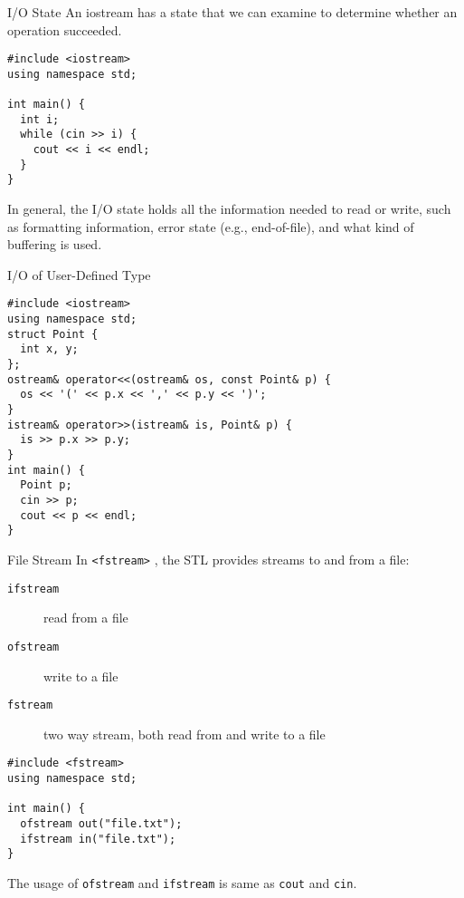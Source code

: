 \documentclass[presentation]{beamer}
\begin{document}
\begin{frame}[fragile,label={sec:orgheadline68}]{I/O State}
 An iostream has a state that we can examine to determine whether an
operation succeeded.

\begin{verbatim}
#include <iostream>
using namespace std;

int main() {
  int i;
  while (cin >> i) {
    cout << i << endl;
  }
}
\end{verbatim}

In general, the I/O state holds all the information needed to read
or write, such as formatting information, error state (e.g.,
end-of-file), and what kind of buffering is used.
\end{frame}

\begin{frame}[fragile,label={sec:orgheadline69}]{I/O of User-Defined Type}
 \begin{verbatim}
#include <iostream>
using namespace std;
struct Point {
  int x, y;
};
ostream& operator<<(ostream& os, const Point& p) {
  os << '(' << p.x << ',' << p.y << ')';
}
istream& operator>>(istream& is, Point& p) {
  is >> p.x >> p.y;
}
int main() {
  Point p;
  cin >> p;
  cout << p << endl;
}
\end{verbatim}
\end{frame}

\begin{frame}[fragile,label={sec:orgheadline70}]{File Stream}
 In \texttt{<fstream>} , the STL provides streams to and from a file:
\begin{description}
\item[{\texttt{ifstream}}] read from a file
\item[{\texttt{ofstream}}] write to a file
\item[{\texttt{fstream}}] two way stream, both read from and write to a file
\end{description}


\begin{verbatim}
#include <fstream>
using namespace std;

int main() {
  ofstream out("file.txt");
  ifstream in("file.txt");
}
\end{verbatim}

The usage of \texttt{ofstream} and \texttt{ifstream} is same as \texttt{cout} and \texttt{cin}.
\end{frame}
\end{document}
